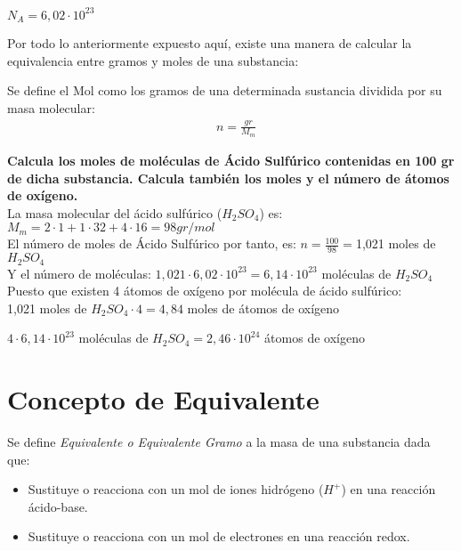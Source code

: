 \begin{center}
$N_A=6,02\cdot10^{23}$
\end{center}
Por todo lo anteriormente expuesto aquí, existe una manera de calcular la equivalencia entre gramos y moles de una substancia:

\begin{definition}
	Se define el Mol como los gramos de una determinada sustancia dividida por su masa molecular:
	\begin{align}
		& n=\frac{gr}{M_m}
	\end{align}
\end{definition}

\begin{exercise}
	\textbf{Calcula los moles de moléculas de Ácido Sulfúrico contenidas en 100 gr de dicha substancia. Calcula también los moles y el número de átomos de oxígeno.}\\
	
	La masa molecular del ácido sulfúrico ($H_2SO_4$) es:
	$M_m = 2\cdot1 + 1\cdot32 + 4\cdot16 = 98 gr/mol$\\
	
	El número de moles de Ácido Sulfúrico por tanto, es:
	$n = \frac{100}{98} = $1,021 moles de $H_2SO_4$\\
	
	Y el número de moléculas: 
	$1,021\cdot6,02\cdot10^{23} = 6,14\cdot10^{23}$  moléculas de $H_2SO_4$\\
	
	Puesto que existen 4 átomos de oxígeno por molécula de ácido sulfúrico:\\
	
	1,021 moles de $H_2SO_4 \cdot 4 = 4,84$ moles de átomos de oxígeno
	
	$4 \cdot 6,14 \cdot10^{23}$  moléculas de $H_2SO_4 = 2,46 \cdot10^{24}$ átomos de oxígeno
	
\end{exercise}

\section{Concepto de Equivalente}

Se define \emph{Equivalente o Equivalente Gramo} a la masa de una substancia dada que:\\

\begin{itemize}
	\item Sustituye o reacciona con un mol de iones hidrógeno ($H^+$) en una reacción ácido-base.\\
	\item Sustituye o reacciona con un mol de electrones en una reacción redox.\\
\end{itemize}


